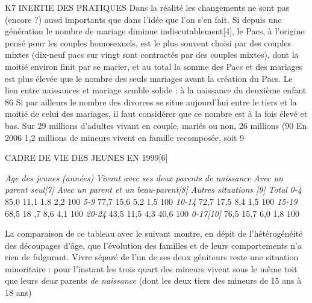K7 INERTIE DES PRATIQUES
 Dans la réalité les changements ne sont pas (encore ?) aussi importants que dans l'idée que l'on s'en fait. Si depuis une génération le nombre de mariage diminue indiscutablement[4], le Pacs, à l'origine pensé pour les couples homosexuels, est le plus souvent choisi par des couples mixtes (dix-neuf pacs sur vingt sont contractés par des couples mixtes), dont la moitié environ finit par se marier, et au total la somme des Pacs et des mariages est plus élevée que le nombre des seuls mariages avant la création du Pacs. Le lien entre naissances et mariage semble solide : à la naissance du deuxième enfant 86 %
 Si par ailleurs le nombre des divorces se situe aujourd'hui entre le tiers et la moitié de celui des mariages, il faut considérer que ce nombre est à la fois élevé et bas. Sur 29 millions d'adultes vivant en couple, mariés ou non, 26 millions (90 %
 En 2006 1,2 millions de mineurs vivent en famille recomposée, soit 9%
 
 
 CADRE DE VIE DES JEUNES EN 1999[6]
 
\emph{Age des jeunes}
\emph{ (années)}
\emph{Vivant avec ses deux parents de naissance}
\emph{Avec un parent seul[7]}
\emph{Avec un parent et un beau-parent[8]}
\emph{Autres situations [9]}
\emph{Total}
\emph{0-4}
85,0
11,1
1,8
2,2
100 %
\emph{5-9}
77,7
15,6
5,2
1,5
100 %
\emph{10-14}
72,7
17,5
8,4
1,5
100 %
\emph{15-19}
68,5
18 ,7
8,6
4,1
100 %
\emph{20-24}
43,5
11,5
4,3
40,6
100 %
\emph{0-17[10]}
76,5
15,7
6,0
1,8
100 %
 
 La comparaison de ce tableau avec le suivant montre, en dépit de l'hétérogénéité des découpages d'âge, que l'évolution des familles et de leurs comportements n'a rien de fulgurant. Vivre séparé de l'un de ses deux géniteurs reste une situation minoritaire : pour l'instant les trois quart des mineurs vivent sous le même toit que leurs\emph{ deux} parents\emph{ de naissanc}\emph{e} (dont les deux tiers des mineurs de 15 ans à 18 ans)
 

